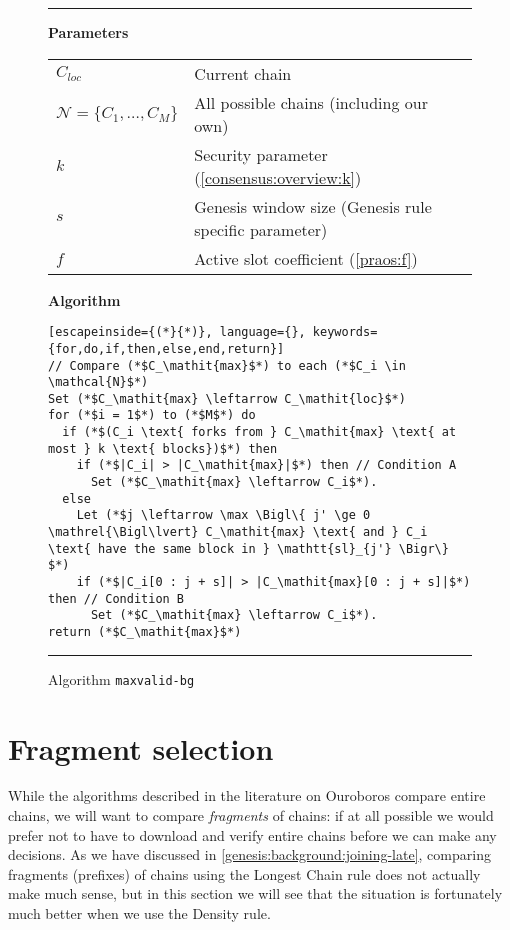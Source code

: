 \begin{figure}
\hrule

\textbf{Parameters} \\[0.5em]
\begin{tabular}{ll}
$C_\mathit{loc}$ & Current chain \\
$\mathcal{N} = \{C_1, \ldots, C_M\}$ & All possible chains (including our own) \\
$k$ & Security parameter (\cref{consensus:overview:k}) \\
$s$ & Genesis window size (Genesis rule specific parameter) \\
$f$ & Active slot coefficient (\cref{praos:f}) \\[1em]
\end{tabular}

\textbf{Algorithm}

\begin{lstlisting}[escapeinside={(*}{*)}, language={}, keywords={for,do,if,then,else,end,return}]
// Compare (*$C_\mathit{max}$*) to each (*$C_i \in \mathcal{N}$*)
Set (*$C_\mathit{max} \leftarrow C_\mathit{loc}$*)
for (*$i = 1$*) to (*$M$*) do
  if (*$(C_i \text{ forks from } C_\mathit{max} \text{ at most } k \text{ blocks})$*) then
    if (*$|C_i| > |C_\mathit{max}|$*) then // Condition A
      Set (*$C_\mathit{max} \leftarrow C_i$*).
  else
    Let (*$j \leftarrow \max \Bigl\{ j' \ge 0 \mathrel{\Bigl\lvert} C_\mathit{max} \text{ and } C_i \text{ have the same block in } \mathtt{sl}_{j'} \Bigr\} $*)
    if (*$|C_i[0 : j + s]| > |C_\mathit{max}[0 : j + s]|$*) then // Condition B
      Set (*$C_\mathit{max} \leftarrow C_i$*).
return (*$C_\mathit{max}$*)
\end{lstlisting}

\hrule
\caption{\label{genesis:maxvalid-bg}Algorithm \texttt{maxvalid-bg}}
\end{figure}

\section{Fragment selection}
\label{genesis:fragment-selection}

While the algorithms described in the literature on Ouroboros compare entire
chains, we will want to compare \emph{fragments} of chains: if at all possible
we would prefer not to have to download and verify entire chains before we can
make any decisions. As we have discussed in
\cref{genesis:background:joining-late}, comparing fragments (prefixes) of chains
using the Longest Chain rule does not actually make much sense, but in this
section we will see that the situation is fortunately much better when we use
the Density rule.

